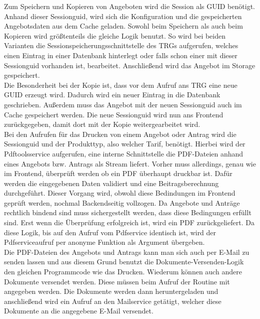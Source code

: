Zum Speichern und Kopieren von Angeboten wird die Session als \ac{GUID} benötigt. Anhand dieser Sessionguid, wird sich die Konfiguration und die gespeicherten Angebotsdaten aus dem Cache geladen. Sowohl beim Speichern als auch beim Kopieren wird größtenteils die gleiche Logik benutzt. So wird bei beiden Varianten die Sessionspeicherungsschnittstelle des \ac{TRG}s aufgerufen, welches einen Eintrag in einer Datenbank hinterlegt oder falls schon einer mit dieser Sessionguid vorhanden ist, bearbeitet. Anschließend wird das Angebot im Storage gespeichert. \\
Die Besonderheit bei der Kopie ist, dass vor dem Aufruf ans \ac{TRG} eine neue \ac{GUID} erzeugt wird. Dadurch wird ein neuer Eintrag in die Datenbank geschrieben. Außerdem muss das Angebot mit der neuen Sessionguid auch im Cache gespeichert werden. Die neue Sessionguid wird nun ans Frontend zurückgegeben, damit dort mit der Kopie weitergearbeitet wird.\\
Bei den Aufrufen für das Drucken von einem Angebot oder Antrag wird die Sessionguid und der Produkttyp, also welcher Tarif, benötigt. Hierbei wird der Pdftoolsservice aufgerufen, eine interne Schnittstelle die PDF-Dateien anhand eines Angebots bzw. Antrags als Stream liefert. Vorher muss allerdings, genau wie im Frontend, überprüft werden ob ein PDF überhaupt druckbar ist. Dafür werden die eingegebenen Daten validiert und eine Beitragsberechnung durchgeführt. Dieser Vorgang wird, obwohl diese Bedindungen im Frontend geprüft werden, nochmal Backendseitig vollzogen. Da Angebote und Anträge rechtlich bindend sind muss sichergestellt werden, dass diese Bedingungen erfüllt sind. Erst wenn die Überprüfung erfolgreich ist, wird ein PDF zurückgeliefert. Da diese Logik, bis auf den Aufruf vom Pdfservice identisch ist, wird der Pdfserviceaufruf per anonyme Funktion als Argument übergeben.\\
Die PDF-Dateien des Angebots und Antrags kann man sich auch per E-Mail zu senden lassen und aus diesem Grund benutzt die Dokumente-Versenden-Logik den gleichen Programmcode wie das Drucken. Wiederum können auch andere Dokumente versendet werden. Diese müssen beim Aufruf der Routine mit angegeben werden. Die Dokumente werden dann heruntergeladen und anschließend wird ein Aufruf an den Mailservice getätigt, welcher diese Dokumente an die angegebene E-Mail versendet.

